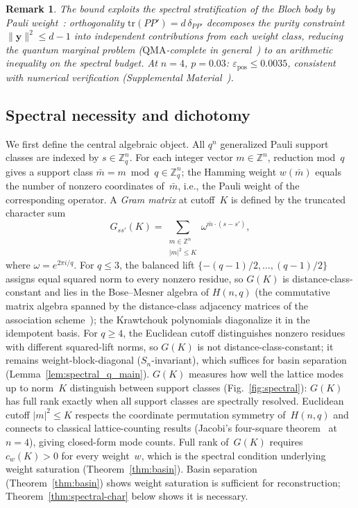\documentclass[twocolumn,prx,aps,superscriptaddress,longbibliography,floatfix]{revtex4-2}
\newtheorem*{remark}{Remark}
\begin{document}
\begin{remark}
The bound exploits the spectral stratification of the
Bloch body by Pauli weight~\cite{BannaiIto1984}: orthogonality
$\mathrm{tr}(PP') = d\,\delta_{PP'}$ decomposes the purity
constraint $\|\mathbf{y}\|^2 \le d - 1$ into independent
contributions from each weight class, reducing the quantum
marginal problem ($\mathrm{QMA}$-complete in
general~\cite{Liu2006,Wei2010}) to an arithmetic inequality
on the spectral budget.
At $n = 4$, $p = 0.03$:
$\varepsilon_{\mathrm{pos}} \le 0.0035$, consistent with
numerical verification
(Supplemental Material~\cite{supplemental}).
\end{remark}

\subsection{Spectral necessity and dichotomy}
\label{sec:spectral-necessity}

We first define the central algebraic object.
All $q^n$ generalized Pauli support classes are indexed by
$s \in \mathbb{Z}_q^n$.  For each integer vector
$m \in \mathbb{Z}^n$, reduction mod~$q$ gives a support class
$\bar{m} = m \bmod q \in \mathbb{Z}_q^n$; the Hamming weight
$w(\bar{m})$ equals the number of nonzero coordinates of~$\bar{m}$,
i.e., the Pauli weight of the corresponding operator.
A \emph{Gram matrix} at cutoff~$K$ is defined by the truncated character sum
\begin{equation}\label{eq:gram-def}
  G_{ss'}(K)
  = \sum_{\substack{m \in \mathbb{Z}^n \\ |m|^2 \le K}}
  \omega^{\bar{m} \cdot (s - s')},
\end{equation}
where $\omega = e^{2\pi i/q}$.
For $q \le 3$, the balanced lift
$\{-(q{-}1)/2,\dots,(q{-}1)/2\}$ assigns equal squared norm to
every nonzero residue, so $G(K)$ is distance-class-constant and
lies in the Bose--Mesner algebra of $H(n,q)$
(the commutative matrix algebra spanned by the distance-class
adjacency matrices of the association
scheme~\cite{Delsarte1973,BannaiIto1984}); the Krawtchouk
polynomials diagonalize it in the idempotent basis.
For $q \ge 4$, the Euclidean cutoff distinguishes nonzero residues
with different squared-lift norms, so $G(K)$ is not
distance-class-constant; it remains weight-block-diagonal
($S_n$-invariant), which suffices for basin separation
(Lemma~\ref{lem:spectral_q_main}).
$G(K)$ measures how well the lattice modes up to norm~$K$ distinguish
between support classes (Fig.~\ref{fig:spectral}): $G(K)$ has full
rank exactly when all support classes are spectrally resolved.
Euclidean cutoff $|m|^2 \le K$ respects the coordinate
permutation symmetry of~$H(n,q)$ and connects to classical
lattice-counting results
(Jacobi's four-square theorem~\cite{HardyWright2008} at $n = 4$),
giving closed-form mode counts.
Full rank of~$G(K)$ requires $c_w(K) > 0$ for every weight~$w$,
which is the spectral condition underlying weight saturation
(Theorem~\ref{thm:basin}).
Basin separation (Theorem~\ref{thm:basin}) shows weight saturation is sufficient
for reconstruction; Theorem~\ref{thm:spectral-char} below shows
it is necessary.
\end{document}
